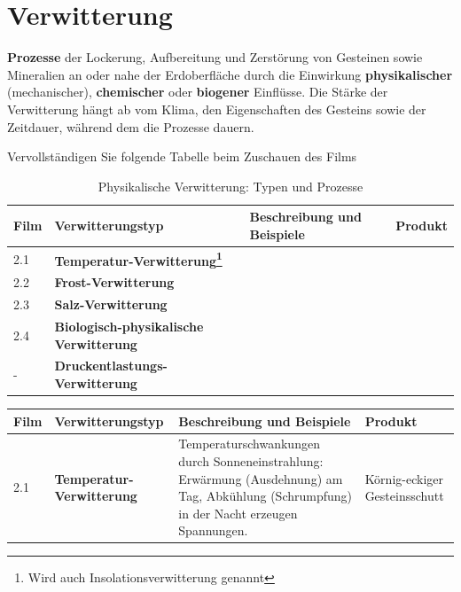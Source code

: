 \section{Verwitterung}
\begin{myExBox}[title=Verwitterung]
\textbf{Prozesse} der Lockerung, Aufbereitung und Zerstörung von Gesteinen sowie Mineralien an oder nahe der Erdoberfläche durch die Einwirkung \textbf{physikalischer} (mechanischer), \textbf{chemischer} oder \textbf{biogener} Einflüsse. Die Stärke der Verwitterung hängt ab vom Klima, den Eigenschaften des Gesteins sowie der Zeitdauer, während dem die Prozesse dauern.
\end{myExBox}

\newpage
\begin{myexercise}
Vervollständigen Sie folgende Tabelle beim Zuschauen des Films
\begin{table}[H]
\centering
\begin{tabular}{@{}l|p{5cm}||p{6cm}|p{2.5cm}@{}}
\toprule
\tiny Film \normalsize &\textbf{Verwitterungstyp} & \textbf{Beschreibung und Beispiele} & \textbf{Produkt} \\
\midrule\midrule
\tiny 2.1 &\textbf{Temperatur-Verwitterung\footnote{Wird auch Insolationsverwitterung genannt}} & & \\[50pt] \midrule
\tiny 2.2 &\textbf{Frost-Verwitterung}  & & \\[50pt] \midrule
\tiny 2.3 &\textbf{Salz-Verwitterung}  & & \\[50pt] \midrule
\tiny 2.4 &\textbf{Biologisch-physikalische Verwitterung}  & & \\[50pt]\midrule
-&\textbf{Druckentlastungs-Verwitterung}  & & \\[50pt]\bottomrule
\end{tabular}
\caption{Physikalische Verwitterung: Typen und Prozesse}
\end{table}
\begin{myanswer}
\begin{table}[H]
\centering
\begin{tabular}{@{}l|p{4cm}||p{6cm}|p{2.5cm}@{}}
\toprule
\tiny Film \normalsize &\textbf{Verwitterungstyp} & \textbf{Beschreibung und Beispiele} & \textbf{Produkt} \\
\midrule\midrule
\tiny 2.1 & \textbf{Temperatur-Verwitterung} & Temperaturschwankungen durch Sonneneinstrahlung: Erwärmung (Ausdehnung) am Tag, Abkühlung (Schrumpfung) in der Nacht erzeugen Spannungen. & Körnig-eckiger Gesteinsschutt \\\midrule

\end{tabular}
\end{table}
\end{myanswer}
\end{myexercise}
